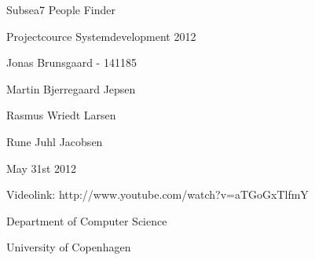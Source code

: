 \begin{figure}
  \thispagestyle{empty}
  \centering
    {\Huge Subsea7 People Finder \par
    }\par
    \par
    \vspace*{0.4cm}
    Projectcource Systemdevelopment 2012 \par
    \vspace*{0.4cm}
    \large Jonas Brunsgaard - 141185 \par
    \vspace*{0.2cm}
    \small Martin Bjerregaard Jepsen \par
    \small Rasmus Wriedt Larsen \par
    \small Rune Juhl Jacobsen \par
    \vspace*{0.4cm}
    May 31st 2012 \par
    \vspace*{0.4cm}
    \small Videolink: http://www.youtube.com/watch?v=aTGoGxTlfmY \par
    \vspace*{0.4cm}
    \small Department of Computer Science \par
    \small University of Copenhagen
\end{figure}
